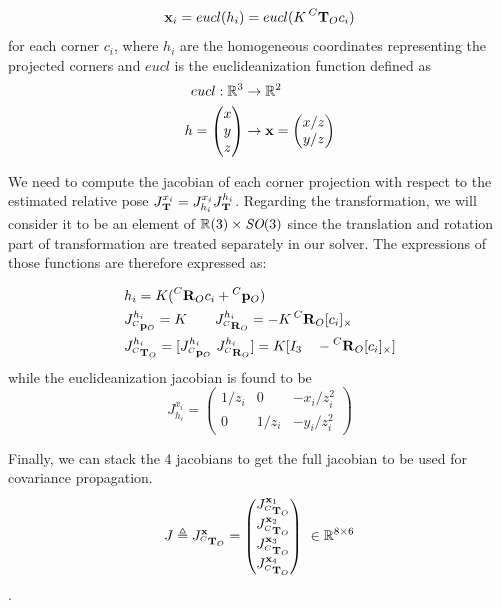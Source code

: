 \begin{equation}
    {\bf x}_i = eucl(h_i) = eucl(K\prescript{C}{}{{\bf T}}_{O} c_i)
\end{equation}
for each corner $c_i$, where $h_i$ are the homogeneous coordinates representing the projected corners and $eucl$ is the euclideanization function defined as
\begin{equation}
    \begin{split}
        eucl: \mathbb{R}^3 &\rightarrow \mathbb{R}^2 \\
        h = \begin{pmatrix}x\\y\\z\end{pmatrix} &\rightarrow {\bf x} = \begin{pmatrix}x/z\\y/z\end{pmatrix}
    \end{split}
\end{equation}

We need to compute the jacobian of each corner projection with respect to the estimated relative pose $J^{x_i}_{\prescript{}{}{{\bf T}}_{}} = J^{x_i}_{h_i} J^{h_i}_{\prescript{}{}{{\bf T}}_{}}$. 
Regarding the transformation, we will consider it to be an element of $\mathbb{R}(3)\times \textit{SO}(3)$ since the translation and rotation part 
of transformation are treated separately in our solver. The expressions of those functions are therefore expressed as:

\begin{equation}
    \begin{split}
        &h_i = K(\prescript{C}{}{{\bf R}}_{O}c_i + \prescript{C}{}{{\bf p}}_{O}) \\
        &J^{h_i}_{\prescript{C}{}{{\bf p}}_{O}} = K ~~~~~~ J^{h_i}_{\prescript{C}{}{{\bf R}}_{O}} = -K\prescript{C}{}{{\bf R}}_{O}[c_i]_{\times}  \\  
        &J^{h_i}_{\prescript{C}{}{{\bf T}}_{O}} = [J^{h_i}_{\prescript{C}{}{{\bf p}}_{O}} ~J^{h_i}_{\prescript{C}{}{{\bf R}}_{O}}] = K [I_3 ~~~ -\prescript{C}{}{{\bf R}}_{O} [c_i]_{\times}]
    \end{split}
\end{equation}
while the euclideanization jacobian is found to be
\begin{equation}
    J^{x_i}_{h_i}
    =
    \begin{pmatrix}
    1/z_i & 0 & -x_i/z_i^2 \\
    0 & 1/z_i & -y_i/z_i^2
    \end{pmatrix}
\end{equation}


Finally, we can stack the 4 jacobians to get the full jacobian to be used for covariance propagation.
\begin{equation}
    J \triangleq J^{{\bf x}}_{\prescript{C}{}{{\bf T}}_{O}}=
    \begin{pmatrix}
    J^{{\bf x}_1}_{\prescript{C}{}{{\bf T}}_{O}} \\ J^{{\bf x}_2}_{\prescript{C}{}{{\bf T}}_{O}} \\ J^{{\bf x}_3}_{\prescript{C}{}{{\bf T}}_{O}} \\ J^{{\bf x}_4}_{\prescript{C}{}{{\bf T}}_{O}}
    \end{pmatrix}
    ~ \in \mathbb{R}^{8 \times 6}
\end{equation}.


